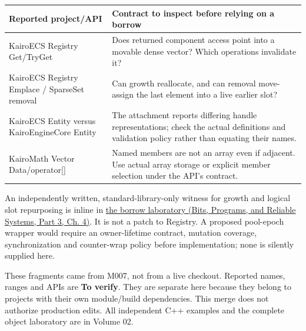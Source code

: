 {\def\LTcaptype{none} %
\begin{longtable}[]{@{}
  >{\raggedright\arraybackslash}p{}
  >{\raggedright\arraybackslash}p{}@{}}
\toprule\noalign{}
\begin{minipage}[b]{\linewidth}\raggedright
Reported project/API
\end{minipage} & \begin{minipage}[b]{\linewidth}\raggedright
Contract to inspect before relying on a borrow
\end{minipage} \\
\midrule\noalign{}
\endhead
\bottomrule\noalign{}
\endlastfoot
KairoECS Registry Get/TryGet & Does returned component access point into a movable dense vector? Which operations invalidate it? \\
KairoECS Registry Emplace / SparseSet removal & Can growth reallocate, and can removal move-assign the last element into a live earlier slot? \\
KairoECS Entity versus KairoEngineCore Entity & The attachment reports differing handle representations; check the actual definitions and validation policy rather than equating their names. \\
KairoMath Vector Data/operator{[}{]} & Named members are not an array even if adjacent. Use actual array storage or explicit member selection under the API's contract. \\
\end{longtable}
}

An independently written, standard-library-only witness for growth and logical slot repurposing is inline in \href{../01-Bits-Programs-and-Reliable-Systems-P03/main.pdf\#nameddest=01-foundations-i-ch004-complete-runnable-borrow-laboratory}{the borrow laboratory (Bits, Programs, and Reliable Systems, Part 3, Ch. 4)}. It is not a patch to Registry. A proposed pool-epoch wrapper would require an owner-lifetime contract, mutation coverage, synchronization and counter-wrap policy before implementation; none is silently supplied here.

These fragments came from M007, not from a live checkout. Reported names, ranges and APIs are \textbf{To verify}. They are separate here because they belong to projects with their own module/build dependencies. This merge does not authorize production edits. All independent C++ examples and the complete object laboratory are in {Volume 02}.


